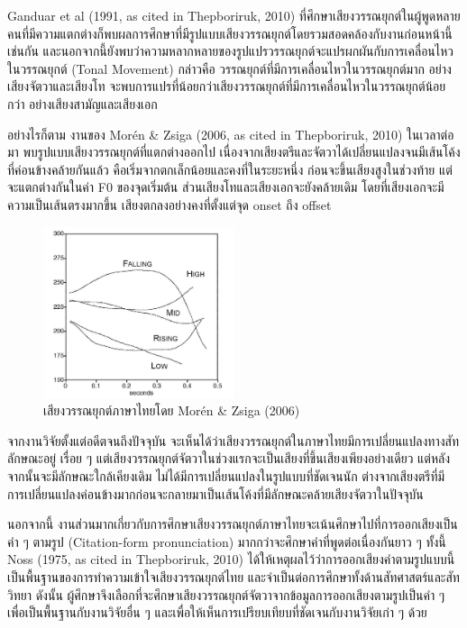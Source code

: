 \documentclass[a4paper]{article}
\begin{document}
    Ganduar et al (1991, as cited in Thepboriruk, 2010) ที่ศึกษาเสียงวรรณยุกต์ในผู้พูดหลายคนที่มีความแตกต่างก็พบผลการศึกษาที่มีรูปแบบเสียงวรรณยุกต์โดยรวมสอดคล้องกับงานก่อนหน้านี้เช่นกัน และนอกจากนี้ยังพบว่าความหลากหลายของรูปแปรวรรณยุกต์จะแปรผกผันกับการเคลื่อนไหวในวรรณยุกต์ (Tonal Movement) กล่าวคือ วรรณยุกต์ที่มีการเคลื่อนไหวในวรรณยุกต์มาก อย่างเสียงจัตวาและเสียงโท จะพบการแปรที่น้อยกว่าเสียงวรรณยุกต์ที่มีการเคลื่อนไหวในวรรณยุกต์น้อยกว่า อย่างเสียงสามัญและเสียงเอก

    อย่างไรก็ตาม งานของ Morén \& Zsiga (2006, as cited in Thepboriruk, 2010) ในเวลาต่อมา พบรูปแบบเสียงวรรณยุกต์ที่แตกต่างออกไป เนื่องจากเสียงตรีและจัตวาได้เปลี่ยนแปลงจนมีเส้นโค้งที่ค่อนข้างคล้ายกันแล้ว คือเริ่มจากตกเล็กน้อยและคงที่ในระยะหนึ่ง ก่อนจะขึ้นเสียงสูงในช่วงท้าย แต่จะแตกต่างกันในค่า F0 ของจุดเริ่มต้น ส่วนเสียงโทและเสียงเอกจะยังคล้ายเดิม โดยที่เสียงเอกจะมีความเป็นเส้นตรงมากขึ้น เสียงตกลงอย่างคงที่ตั้งแต่จุด onset ถึง offset
    \begin{figure}[!ht]
        \begin{center}
        \includegraphics[width=0.5\textwidth]{zsiga}
        \end{center}
        \caption{เสียงวรรณยุกต์ภาษาไทยโดย Morén \& Zsiga (2006)}
    \end{figure}
    \newpage

    จากงานวิจัยตั้งแต่อดีตจนถึงปัจจุบัน จะเห็นได้ว่าเสียงวรรณยุกต์ในภาษาไทยมีการเปลี่ยนแปลงทางสัทลักษณะอยู่ เรื่อย ๆ แต่เสียงวรรณยุกต์จัตวาในช่วงแรกจะเป็นเสียงที่ขึ้นเสียงเพียงอย่างเดียว แต่หลังจากนั้นจะมีลักษณะใกล้เคียงเดิม ไม่ได้มีการเปลี่ยนแปลงในรูปแบบที่ชัดเจนนัก ต่างจากเสียงตรีที่มีการเปลี่ยนแปลงค่อนข้างมากก่อนจะกลายมาเป็นเส้นโค้งที่มีลักษณะคล้ายเสียงจัตวาในปัจจุบัน

    นอกจากนี้ งานส่วนมากเกี่ยวกับการศึกษาเสียงวรรณยุกต์ภาษาไทยจะเน้นศึกษาไปที่การออกเสียงเป็นคำ ๆ ตามรูป (Citation-form pronunciation) มากกว่าจะศึกษาคำที่พูดต่อเนื่องกันยาว ๆ ทั้งนี้ Noss (1975, as cited in Thepboriruk, 2010) ได้ให้เหตุผลไว้ว่าการออกเสียงคำตามรูปแบบนี้เป็นพื้นฐานของการทำความเข้าใจเสียงวรรณยุกต์ไทย และจำเป็นต่อการศึกษาทั้งด้านสัทศาสตร์และสัทวิทยา ดังนั้น ผู้ศึกษาจึงเลือกที่จะศึกษาเสียงวรรณยุกต์จัตวาจากข้อมูลการออกเสียงตามรูปเป็นคำ ๆ เพื่อเป็นพื้นฐานกับงานวิจัยอื่น ๆ และเพื่อให้เห็นการเปรียบเทียบที่ชัดเจนกับงานวิจัยเก่า ๆ ด้วย
\end{document}
